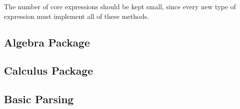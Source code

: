 \documentclass{article}
\begin{document}
The number of core expressions should be kept small, since every new type of expression must implement all of these methods. 

\subsection{Algebra Package}

\subsection{Calculus Package}

\subsection{Basic Parsing}
\end{document}
